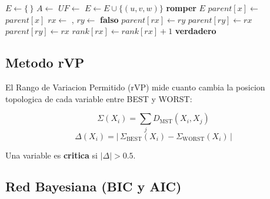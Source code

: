 \documentclass[12pt, a4paper]{article}
\begin{document}
\begin{algorithm}[H]
\caption{Kruskal MAX con Union-Find}\label{alg:kruskal}
\begin{algorithmic}[1]
    \State $E \gets \{\,\}$
    \State $A \gets$ 
    \State $UF \gets$ 
            \State {}
            \State $E \gets E \cup \{(u, v, w)\}$
             \State \textbf{romper} \EndIf
        \EndIf
    \EndFor
    \State \Return $E$
\EndFunction
\Statex
{} 
        \State $parent[x] \gets$ 
    \EndIf
    \State \Return $parent[x]$
\EndFunction
\Statex
{} 
    \State $rx \gets$ , $ry \gets$ 
     \State \Return \textbf{falso} \EndIf
        \State $parent[rx] \gets ry$
        \State $parent[ry] \gets rx$
    \Else
        \State $parent[ry] \gets rx$
        \State $rank[rx] \gets rank[rx] + 1$
    \EndIf
    \State \Return \textbf{verdadero}
\EndFunction
\end{algorithmic}
\end{algorithm}

\subsection{Metodo rVP}

El Rango de Variacion Permitido (rVP) mide cuanto cambia la posicion
topologica de cada variable entre BEST y WORST:

\begin{equation*}
    \Sigma(X_i) = \sum_{j} D_{\text{MST}}(X_i, X_j)
\end{equation*}
\begin{equation*}
    \Delta(X_i) = \big|\,\Sigma_{\text{BEST}}(X_i) - \Sigma_{\text{WORST}}(X_i)\,\big|
\end{equation*}

Una variable es \textbf{critica} si $|\Delta| > 0.5$.

\subsection{Red Bayesiana (BIC y AIC)}
\end{document}
